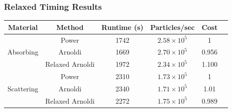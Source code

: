 \documentclass[color={usenames, dvipsnames},ignorenonframetext]{beamer}
\begin{document}
\begin{frame}
    \frametitle{Relaxed Timing Results}
    \begin{table}
        \centering
        \begin{tabular}{cccccc}
            \toprule
            Material & Method & Runtime (s) & Particles/sec & Cost \\
            \midrule
            \multirow{3}{15mm}{Absorbing} & Power & 1742 & $2.58 \times 10^5$  & 1 \\ %
            & Arnoldi & 1669 & $2.70 \times 10^5$ & 0.956 \\ %
            & Relaxed Arnoldi & 1972 & $2.34 \times 10^5$ & 1.100 \\ %
            \midrule
            \multirow{3}{15mm}{Scattering} & Power & 2310 & $1.73 \times 10^5$  & 1 \\ %
            & Arnoldi & 2340 & $1.71 \times 10^5$ & 1.01 \\ %
            & Relaxed Arnoldi & 2272 & $1.75 \times 10^5$ & 0.989 \\ %
            \bottomrule
        \end{tabular}
        \label{tab:Timing}
    \end{table}
\end{frame}
\end{document}

